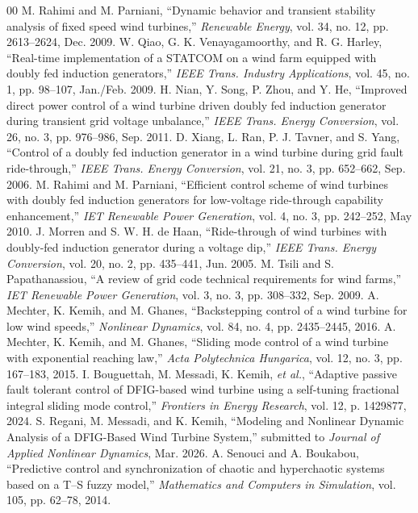 \documentclass[conference]{IEEEtran}
\begin{document}
\begin{thebibliography}{00}
 M. Rahimi and M. Parniani, ``Dynamic behavior and transient stability analysis of fixed speed wind turbines,'' \textit{Renewable Energy}, vol. 34, no. 12, pp. 2613--2624, Dec. 2009.
 W. Qiao, G. K. Venayagamoorthy, and R. G. Harley, ``Real-time implementation of a STATCOM on a wind farm equipped with doubly fed induction generators,'' \textit{IEEE Trans. Industry Applications}, vol. 45, no. 1, pp. 98--107, Jan./Feb. 2009.
 H. Nian, Y. Song, P. Zhou, and Y. He, ``Improved direct power control of a wind turbine driven doubly fed induction generator during transient grid voltage unbalance,'' \textit{IEEE Trans. Energy Conversion}, vol. 26, no. 3, pp. 976--986, Sep. 2011.
 D. Xiang, L. Ran, P. J. Tavner, and S. Yang, ``Control of a doubly fed induction generator in a wind turbine during grid fault ride-through,'' \textit{IEEE Trans. Energy Conversion}, vol. 21, no. 3, pp. 652--662, Sep. 2006.
 M. Rahimi and M. Parniani, ``Efficient control scheme of wind turbines with doubly fed induction generators for low-voltage ride-through capability enhancement,'' \textit{IET Renewable Power Generation}, vol. 4, no. 3, pp. 242--252, May 2010.
 J. Morren and S. W. H. de Haan, ``Ride-through of wind turbines with doubly-fed induction generator during a voltage dip,'' \textit{IEEE Trans. Energy Conversion}, vol. 20, no. 2, pp. 435--441, Jun. 2005.
 M. Tsili and S. Papathanassiou, ``A review of grid code technical requirements for wind farms,'' \textit{IET Renewable Power Generation}, vol. 3, no. 3, pp. 308--332, Sep. 2009.
 A. Mechter, K. Kemih, and M. Ghanes, ``Backstepping control of a wind turbine for low wind speeds,'' \textit{Nonlinear Dynamics}, vol. 84, no. 4, pp. 2435--2445, 2016.
 A. Mechter, K. Kemih, and M. Ghanes, ``Sliding mode control of a wind turbine with exponential reaching law,'' \textit{Acta Polytechnica Hungarica}, vol. 12, no. 3, pp. 167--183, 2015.
 I. Bouguettah, M. Messadi, K. Kemih, \textit{et al.}, ``Adaptive passive fault tolerant control of DFIG-based wind turbine using a self-tuning fractional integral sliding mode control,'' \textit{Frontiers in Energy Research}, vol. 12, p. 1429877, 2024.
 S. Regani, M. Messadi, and K. Kemih, ``Modeling and Nonlinear Dynamic Analysis of a DFIG-Based Wind Turbine System,'' submitted to \textit{Journal of Applied Nonlinear Dynamics}, Mar. 2026.
 A. Senouci and A. Boukabou, ``Predictive control and synchronization of chaotic and hyperchaotic systems based on a T--S fuzzy model,'' \textit{Mathematics and Computers in Simulation}, vol. 105, pp. 62--78, 2014.

\end{thebibliography}
\end{document}
